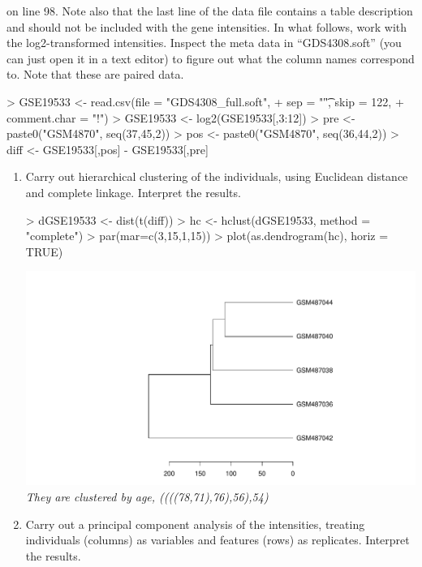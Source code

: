 \documentclass[12pt,a4paper]{paper}
\begin{document}
\begin{enumerate}
on line 98. Note also that the last line of the data file contains a table description and should
not be included with the gene intensities. In what follows, work with the log2-transformed
intensities. Inspect the meta data in “GDS4308.soft” (you can just open it in a text editor)
to figure out what the column names correspond to. Note that these are paired data.
\begin{Schunk}
\begin{Sinput}
> GSE19533 <- read.csv(file = "GDS4308_full.soft", 
+                      sep = "\t", skip = 122, 
+                      comment.char = "!")
> GSE19533 <- log2(GSE19533[,3:12])
> pre <- paste0("GSM4870", seq(37,45,2))
> pos <- paste0("GSM4870", seq(36,44,2))
> diff <- GSE19533[,pos] - GSE19533[,pre]
\end{Sinput}
\end{Schunk}
\begin{enumerate}
\item Carry out hierarchical clustering of the individuals, using Euclidean distance and complete linkage. Interpret the results.
\begin{Schunk}
\begin{Sinput}
> dGSE19533 <- dist(t(diff))
> hc <- hclust(dGSE19533, method = "complete")
> par(mar=c(3,15,1,15))
> plot(as.dendrogram(hc), horiz = TRUE)
\end{Sinput}
\end{Schunk}
\includegraphics{Osorio_Daniel_HW2-007}
\\\textit{They are clustered by age, ((((78,71),76),56),54)}
\item Carry out a principal component analysis of the intensities, treating individuals (columns)
as variables and features (rows) as replicates. Interpret the results.
\begin{Schunk}
\begin{Sinput}

\end{Sinput}
\end{Schunk}
\end{enumerate}
\end{enumerate}
\end{document}
